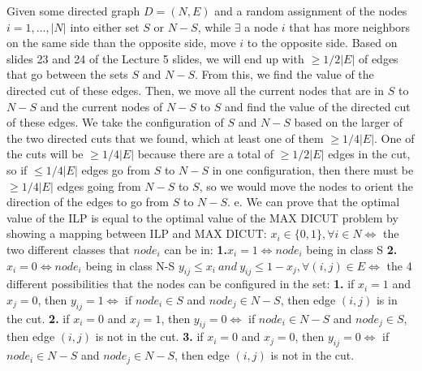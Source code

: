 \documentclass[oneside]{homework} %
\begin{document}
Given some directed graph $D = (N,E)$ and a random assignment of the nodes $i = 1,...,|N|$ into either set $S$ or $N-S$, while $\exists$ a node $i$ that has more neighbors on the same side than the opposite side, move $i$ to the opposite side. Based on slides 23 and 24 of the Lecture 5 slides, we will end up with $\geq 1/2|E|$ of edges that go between the sets $S$ and $N-S$. From this, we find the value of the directed cut of these edges. Then, we move all the current nodes that are in $S$ to $N-S$ and the current nodes of $N-S$ to $S$ and find the value of the directed cut of these edges. We take the configuration of $S$ and $N-S$ based on the larger of the two directed cuts that we found, which at least one of them $\geq 1/4|E|$. One of the cuts will be $\geq 1/4|E|$ because there are a total of $\geq 1/2|E|$ edges in the cut, so if $\leq 1/4|E|$ edges go from $S$ to $N-S$ in one configuration, then there must be $\geq 1/4|E|$ edges going from $N-S$ to $S$, so we would move the nodes to orient the direction of the edges to go from $S$ to $N-S$.
\newline
\newline
{\large e.} We can prove that the optimal value of the ILP is equal to the optimal value of the MAX DICUT problem by showing a mapping between ILP and MAX DICUT: \newline
\newline
$x_i \in \{0,1\}, \forall i \in N \Leftrightarrow$ the two different classes that $node_i$ can be in: \newline
\textbf{1.}$ x_i = 1 \Leftrightarrow node_i$ being in class S \newline
\textbf{2.}$x_i = 0 \Leftrightarrow node_i$ being in class N-S \newline
\newline
$y_{ij} \leq x_i \ and \ y_{ij} \leq 1 - x_j,  \forall (i, j) \in E \Leftrightarrow$ the 4 different possibilities that the nodes can be configured in the set:
\newline
\textbf{1.} if $x_i = 1$ and $x_j = 0$, then $y_{ij} = 1 \Leftrightarrow$ if $node_i \in S$ and $node_j \in N-S$, then edge $(i,j)$ is in the cut.
\newline
\textbf{2.} if $x_i = 0$ and $x_j = 1$, then $y_{ij} = 0 \Leftrightarrow$ if $node_i \in N-S$ and $node_j \in S$, then edge $(i,j)$ is not in the cut.
\newline
\textbf{3.} if $x_i = 0$ and $x_j = 0$, then $y_{ij} = 0 \Leftrightarrow$ if $node_i \in N-S$ and $node_j \in N-S$, then edge $(i,j)$ is not in the cut.
\end{document}
